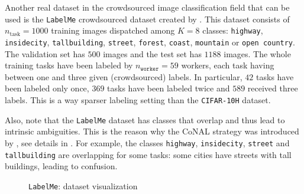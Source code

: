 Another real dataset in the crowdsourced image classification field that can be used is the \texttt{LabelMe} crowdsourced dataset created by \citet{rodrigues2018deep}.
This dataset consists of $n_\text{task}=1000$ training images dispatched among $K=8$ classes:
\texttt{highway}, \texttt{insidecity}, \texttt{tallbuilding}, \texttt{street}, \texttt{forest}, \texttt{coast}, \texttt{mountain} or \texttt{open country}.
The validation set has $500$ images and the test set has $1188$ images.
The whole training tasks have been labeled by $n_\texttt{worker}=59$ workers, each task having between one and three given (crowdsourced) labels.
In particular, $42$ tasks have been labeled only once, $369$ tasks have been labeled twice and $589$ received three labels.
This is a way sparser labeling setting than the \texttt{CIFAR-10H} dataset.

Also, note that the \texttt{LabelMe} dataset has classes that overlap and thus lead to intrinsic ambiguities.
This is the reason why the CoNAL strategy was introduced by \citet{chu2021learning}, see details in .
For example, the classes \texttt{highway}, \texttt{insidecity}, \texttt{street} and \texttt{tallbuilding} are overlapping for some tasks:
some cities have streets with tall buildings, leading to confusion.

\begin{figure}[thb]
    \centering
     \hfill
     \hfill
    \caption{\texttt{LabelMe}: dataset visualization}
    \label{fig:LabelMe_dataset_visualization}
\end{figure}

